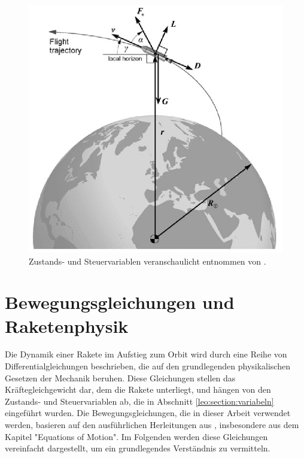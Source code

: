 \begin{figure}
	\centering
	\includegraphics[width=0.5\linewidth]{papers/leo/Grafiken/forces.png}
	\caption{Zustands- und Steuervariablen veranschaulicht entnommen von \cite{leo:astronautics}.}
	\label{fig:leo:forces}
\end{figure}



\section{Bewegungsgleichungen und Raketenphysik \label{leo:section:beweungsgleichungen}}

Die Dynamik einer Rakete im Aufstieg zum Orbit wird durch eine Reihe von Differentialgleichungen beschrieben, die auf den grundlegenden physikalischen Gesetzen der Mechanik beruhen. 
Diese Gleichungen stellen das Kräftegleichgewicht dar, dem die Rakete unterliegt, und hängen von den Zustands- und Steuervariablen ab, die in Abschnitt \ref{leo:section:variabeln} eingeführt wurden. 
Die Bewegungsgleichungen, die in dieser Arbeit verwendet werden, basieren auf den ausführlichen Herleitungen aus \cite{leo:astronautics}, insbesondere aus dem Kapitel "Equations of Motion". 
Im Folgenden werden diese Gleichungen vereinfacht dargestellt, um ein grundlegendes Verständnis zu vermitteln.

